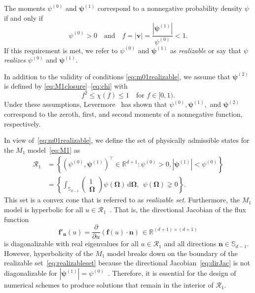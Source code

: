 \documentclass[preprint, 11pt]{elsarticle}
\newcommand{\diff}{\mathrm{d} }
\newcommand{\R}{\mathbb{R}}
\newcommand{\vel}{\mathbf{v}}
\newcommand{\n}{\mathbf{n}}
\newcommand{\f}{\mathbf{f}}
\newcommand{\Sp}{\mathbb{S}_{d-1}}
\newcommand{\OO}{\bm{\Omega}}
\newcommand{\pz}{\psi^{(0)}}
\newcommand{\po}{\boldsymbol{\psi}^{(1)}}
\newcommand{\pt}{\boldsymbol{\psi}^{(2)}}
\begin{document}
The moments $\pz$ and $\po$ correspond to a nonnegative probability density
$\psi$ if and only if~\cite{kershaw1976}
\begin{equation}\label{eq:m01realizable}
    \pz >0\quad\text{and}\quad f = |\vel|=\frac{|\po|}{\pz}<1.
\end{equation}
If this requirement is met, we
refer to $\pz$ and $\po$ as \textit{realizable} or say that $\psi$ \textit{realizes} $\pz$ and $\po$.
\medskip

In addition to the validity of conditions \eqref{eq:m01realizable}, we assume that  
$\pt$ is defined by \eqref{eq:M1closure}--\eqref{eq:chi} with
\begin{equation*}
    f^2\leq\chi(f)\leq 1\quad \text{for }f\in[0,1).
\end{equation*}
Under these assumptions, Levermore~\cite{levermore1984} has shown that $\pz,\po,$ and $\pt$ correspond to the zeroth, first, and second moments of a nonnegative function, respectively.

In view of~\eqref{eq:m01realizable}, we define the set of physically admissible states for the $M_1$ model~\eqref{eq:M1} as
\begin{equation}\label{eq:realizableset}
\begin{split}
    \mathcal{R}_1 &=\left\{(\pz,\po)^{\top}\in\R^{d+1}: \pz >0, |\po|< \pz\right\}\\
    &= \left\{\int_{\Sp}
\left(\begin{array}{cc}
         1\\
         \OO
  \end{array}\right)
\psi(\OO)\,\diff\OO,\ \ \psi(\OO)\gneq0\right\}.
\end{split}
\end{equation}
This set is a convex cone that is referred to as \textit{realizable set}.
Furthermore, the $M_1$ model is hyperbolic for all $u\in\mathcal{R}_1$~\cite{berthon2007,levermore1996}.
That is, the directional Jacobian of the flux function
\begin{equation}\label{eq:dirJac}
    \f'_{\n}(u) = \frac{\partial}{\partial u}\left( \f(u)\cdot \n\right)\,\in\R^{(d+1)\times(d+1)}
\end{equation}
is diagonalizable with real eigenvalues for all $u\in\mathcal{R}_1$  and all directions $\n\in\Sp$.
However, hyperbo\-licity of the $M_1$ model breaks down on the boundary of the realizable set~\eqref{eq:realizableset} because the directional Jacobian~\eqref{eq:dirJac} is not diagonalizable for $|\po| =\pz$~\cite{chidyagwai2018}.
Therefore, it is essential for the design of numerical schemes to produce solutions that remain in the interior of $\mathcal{R}_1$.
\end{document}
